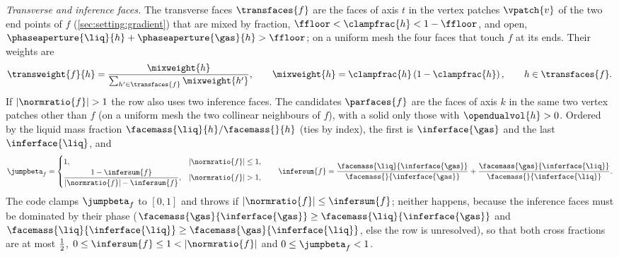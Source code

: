 \emph{Transverse and inference faces.} The transverse faces $\transfaces{f}$
are the faces of axis $t$ in the vertex patches $\vpatch{v}$ of the two end
points of $f$ (\cref{sec:setting:gradient}) that are mixed by fraction,
$\ffloor<\clampfrac{h}<1-\ffloor$, and open,
$\phaseaperture{\liq}{h}+\phaseaperture{\gas}{h}>\ffloor$; on a uniform mesh
the four faces that touch $f$ at its ends. Their weights
are~
\begin{equation}\label{eq:projection:transverse}
  \transweight{f}{h}=\frac{\mixweight{h}}{\sum_{h'\in\transfaces{f}}\mixweight{h'}},\qquad
  \mixweight{h}=\clampfrac{h}\roundpar{1-\clampfrac{h}},\qquad h\in\transfaces{f}.
\end{equation}
If $\abs{\normratio{f}}>1$ the row also uses two inference faces. The
candidates $\parfaces{f}$ are the faces of axis $k$ in the same two vertex
patches other than $f$ (on a uniform mesh the two collinear neighbours of $f$),
with a solid only those with $\opendualvol{h}>0$. Ordered by the liquid mass
fraction $\facemass{\liq}{h}/\facemass{}{h}$ (ties by index), the first is
$\inferface{\gas}$ and the last $\inferface{\liq}$, and
\begin{equation}\label{eq:projection:beta}
  \jumpbeta_f=\begin{cases}
    1, & \abs{\normratio{f}}\le1,\\[2pt]
    \dfrac{1-\infersum{f}}{\abs{\normratio{f}}-\infersum{f}}, & \abs{\normratio{f}}>1,
  \end{cases}
  \qquad
  \infersum{f}=\frac{\facemass{\liq}{\inferface{\gas}}}{\facemass{}{\inferface{\gas}}}
    +\frac{\facemass{\gas}{\inferface{\liq}}}{\facemass{}{\inferface{\liq}}} .
\end{equation}
The code clamps $\jumpbeta_f$ to $[0,1]$ and throws if
$\abs{\normratio{f}}\le\infersum{f}$; neither happens, because the inference
faces must be dominated by their phase
($\facemass{\gas}{\inferface{\gas}}\ge\facemass{\liq}{\inferface{\gas}}$ and
$\facemass{\liq}{\inferface{\liq}}\ge\facemass{\gas}{\inferface{\liq}}$, else
the row is unresolved), so that both cross fractions are at most $\frac{1}{2}$,
$0\le\infersum{f}\le1<\abs{\normratio{f}}$ and $0\le\jumpbeta_f<1$.

